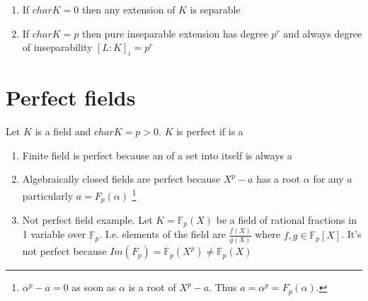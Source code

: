 \begin{remark}
  \begin{enumerate}
  \item If $char K = 0$ then any extension of $K$ is separable
  \item If $char K = p$ then pure inseparable extension has degree
    $p^r$ and always degree of inseparability
    $\left[L:K\right]_i = p^r$
  \end{enumerate}
\end{remark}

\section{Perfect fields}

\begin{definition}
  Let $K$ is a field and $char K = p > 0$. $K$ is perfect if
   is a 
  \label{def:perfectfield}
\end{definition}

\begin{example}
  \begin{enumerate}
    \item Finite field is perfect because an 
      of a set into itself is always a 
    \item Algebraically closed fields are perfect because
      $X^p - a$ has a root $\alpha$ for any $a$ particularly
      $a = F_p\left(\alpha\right)$
      \footnote{
        $\alpha^p -a =0$ as soon as $\alpha$ is a root of $X^p - a$.
        Thus $a = \alpha^p = F_p\left(\alpha\right)$.
      }
    \item Not perfect field example. Let
      $K=\mathbb{F}_p\left(X\right)$ be a field of rational fractions
      in 1 variable over $\mathbb{F}_p$. I.e. elements of the field
      are $\frac{f(X)}{g(X)}$ where
      $f,g \in \mathbb{F}_p\left[X\right]$. It's not perfect because
      $Im\left(F_p\right) = \mathbb{F}_p\left(X^p\right) \ne
      \mathbb{F}_p\left(X\right)$ 
  \end{enumerate}
\end{example}

